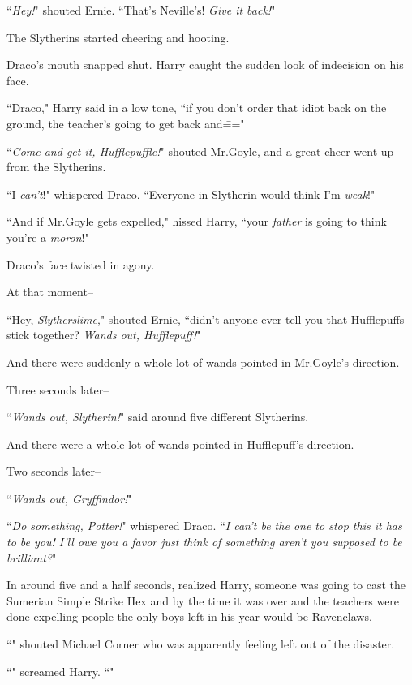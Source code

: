 ``\emph{Hey!}" shouted Ernie. ``That's Neville's! \emph{Give it back!}"

The Slytherins started cheering and hooting.

Draco's mouth snapped shut. Harry caught the sudden look of indecision on his face.

``Draco," Harry said in a low tone, ``if you don't order that idiot back on the ground, the teacher's going to get back and\==="

``\emph{Come and get it, Hufflepuffle!}" shouted Mr.\?Goyle, and a great cheer went up from the Slytherins.

``I \emph{can't}!" whispered Draco. ``Everyone in Slytherin would think I'm \emph{weak}!"

``And if Mr.\?Goyle gets expelled," hissed Harry, ``your \emph{father} is going to think you're a \emph{moron}!"

Draco's face twisted in agony.

At that moment\---

``Hey, \emph{Slytherslime}," shouted Ernie, ``didn't anyone ever tell you that Hufflepuffs stick together? \emph{Wands out, Hufflepuff!}"

And there were suddenly a whole lot of wands pointed in Mr.\?Goyle's direction.

Three seconds later\---

``\emph{Wands out, Slytherin!}" said around five different Slytherins.

And there were a whole lot of wands pointed in Hufflepuff's direction.

Two seconds later\---

``\emph{Wands out, Gryffindor!}"

``\emph{Do something, Potter!}" whispered Draco. ``\emph{I can't be the one to stop this it has to be you! I'll owe you a favor just think of something aren't you supposed to be brilliant?}"

In around five and a half seconds, realized Harry, someone was going to cast the Sumerian Simple Strike Hex and by the time it was over and the teachers were done expelling people the only boys left in his year would be Ravenclaws.

``" shouted Michael Corner who was apparently feeling left out of the disaster.

``" screamed Harry. ``"

